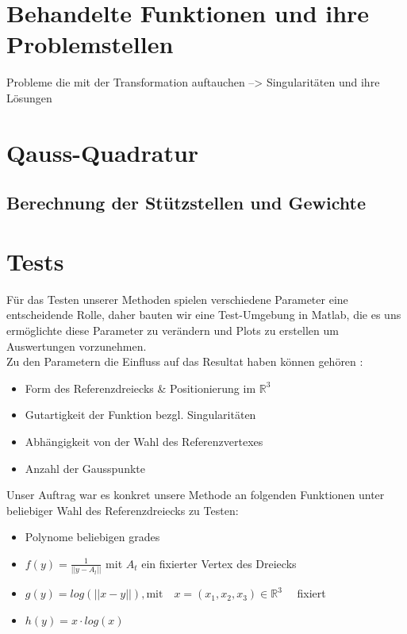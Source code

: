 \documentclass[12pt]{article}
\newcommand{\R}{\mathbb{R}}
\begin{document}
\newpage

\section{Behandelte Funktionen und ihre Problemstellen}


Probleme die mit der Transformation auftauchen --> Singularitäten und ihre Lösungen

\newpage

\section{Qauss-Quadratur}
\subsection{Berechnung der Stützstellen und Gewichte}

\newpage

\section{Tests}

Für das Testen unserer Methoden spielen verschiedene Parameter eine entscheidende Rolle, daher bauten wir eine Test-Umgebung in Matlab, die es uns ermöglichte diese Parameter zu verändern und Plots zu erstellen um Auswertungen vorzunehmen.
\\
Zu den Parametern die Einfluss auf das Resultat haben können gehören :

\begin{itemize}
	\item Form des Referenzdreiecks \& Positionierung im $\mathbb{R}^3$
	\item Gutartigkeit der Funktion bezgl. Singularitäten
	\item Abhängigkeit von der Wahl des Referenzvertexes
	\item Anzahl der Gausspunkte
\end{itemize}

Unser Auftrag war es konkret unsere Methode an folgenden Funktionen unter beliebiger Wahl des Referenzdreiecks zu Testen:




\begin{itemize}
	\item Polynome beliebigen grades
	\item $f(y) = \frac{1}{||y - A_l||} $ mit $A_t$ ein fixierter Vertex des Dreiecks
	\item $g(y) = log(||x - y||)  , \text{mit} \quad x = (x_1,x_2,x_3) \in \R^3\quad$ fixiert 
	\item $h(y) =x\cdot log(x) $
\end{itemize}
\end{document}
